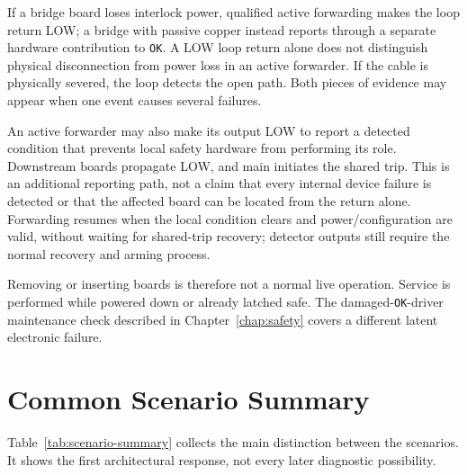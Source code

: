 If a bridge board loses interlock power, qualified active forwarding makes the loop return LOW; a bridge with passive copper instead reports through a separate hardware contribution to \texttt{OK}. A LOW loop return alone does not distinguish physical disconnection from power loss in an active forwarder. If the cable is physically severed, the loop detects the open path. Both pieces of evidence may appear when one event causes several failures.

An active forwarder may also make its output LOW to report a detected condition that prevents local safety hardware from performing its role. Downstream boards propagate LOW, and main initiates the shared trip. This is an additional reporting path, not a claim that every internal device failure is detected or that the affected board can be located from the return alone. Forwarding resumes when the local condition clears and power/configuration are valid, without waiting for shared-trip recovery; detector outputs still require the normal recovery and arming process.

Removing or inserting boards is therefore not a normal live operation. Service is performed while powered down or already latched safe. The damaged-\texttt{OK}-driver maintenance check described in Chapter~\ref{chap:safety} covers a different latent electronic failure.

\section{Common Scenario Summary}

Table~\ref{tab:scenario-summary} collects the main distinction between the scenarios. It shows the first architectural response, not every later diagnostic possibility.


